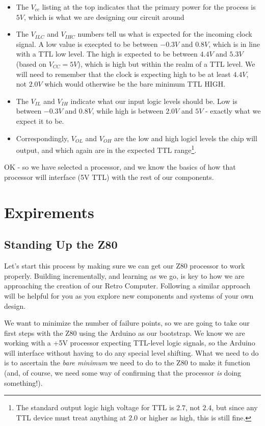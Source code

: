 \begin{itemize}
\item The $V_{cc}$ listing at the top indicates that the primary power for the process is $5V$, which is what we are designing our circuit around
\item The $V_{ILC}$ and $V_{IHC}$ numbers tell us what is expected for the incoming clock signal. A low value is execpted to be between $-0.3V$ and $0.8V$, which is in line with a TTL low level. The high is expected to be between $4.4V$ and $5.3V$ (based on $V_{CC} = 5V$), which is high but within the realm of a TTL level. We will need to remember that the clock is expecting high to be at least $4.4V$, not $2.0V$ which would otherwise be the bare minimum TTL HIGH.
\item The $V_{IL}$ and $V_{IH}$ indicate what our input logic levels should be. Low is between $-0.3V$ and $0.8V$, while high is between $2.0V$ and $5V$ - exactly what we expect it to be. 
\item Correspondingly, $V_{OL}$ and $V_{OH}$ are the low and high logicl levels the chip will output, and which again are in the expected TTL range\footnote{The standard output logic high voltage for TTL is $2.7$, not $2.4$, but since any TTL device must treat anything at $2.0$ or higher as high, this is still fine.}.
\end{itemize}

OK - so we have selected a processor, and we know the basics of how that processor will interface (5V TTL) with the rest of our components. 

\chapter{Expirements}
\section{Standing Up the Z80}

Let's start this process by making sure we can get our Z80 processor to work properly. Building incrementally, and learning as we go,
is key to how we are approaching the creation of our Retro Computer. Following a similar approach will be helpful for you as you explore new components and systems of your own design.

We want to minimize the number of failure points, so we are going to take our first steps with the Z80 using the Arduino as our bootstrap. We know we are working with a +5V processor expecting TTL-level logic signals, so the Arduino will interface without having to do any special level shifting. What we need to do is to ascertain the \textit{bare minimum} we need to do to the Z80 to make it function (and, of course, we need some way of confirming that the processor \textit{is} doing something!).

